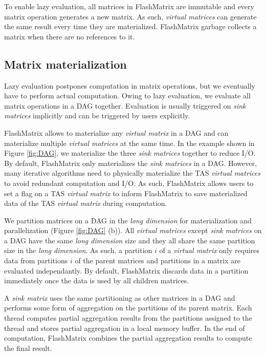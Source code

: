 To enable lazy evaluation, all matrices in FlashMatrix are immutable and every
matrix operation generates a new matrix. As such, \textit{virtual matrices}
can generate the same result every time they are materialized. FlashMatrix
garbage collects a matrix when there are no references to it.

\subsection{Matrix materialization} \label{sec:materialize}
Lazy evaluation postpones computation in matrix operations, but we eventually
have to perform actual computation. Owing to lazy evaluation,
we evaluate all matrix operations in a DAG together. Evaluation is
usually triggered on \textit{sink matrices} implicitly and can be triggered
by users explicitly.

FlashMatrix allows to materialize any \textit{virtual matrix} in a DAG and
can materialize multiple \textit{virtual matrices} at the same time.
In the example shown in Figure \ref{fig:DAG}, we materialize the three
\textit{sink matrices} together to reduce I/O.
By default, FlashMatrix only materializes the \textit{sink matrices} in a DAG.
However, many iterative algorithms need to physically materialize the TAS
\textit{virtual matrices} to avoid redundant computation and I/O. As such,
FlashMatrix allows users to set a flag on a TAS \textit{virtual matrix} to
inform FlashMatrix to save materialized data of the TAS \textit{virtual matrix}
during computation.

We partition matrices on a DAG in the \textit{long dimension} for materialization
and parallelization (Figure \ref{fig:DAG} (b)). All \textit{virtual matrices}
except \textit{sink matrices} on a DAG have the same \textit{long dimension}
size and they all share the same partition size in the \textit{long dimension}.
As such, a partition $i$ of a \textit{virtual matrix} only requires data from
partitions $i$ of the parent matrices and partitions in a matrix are
evaluated independantly. By default, FlashMatrix discards data in a partition
immediately once the data is used by all children matrices.

A \textit{sink matrix} uses the same partitioning as other matrices in a DAG
and performs some form of aggregation on the partitions
of its parent matrix. Each thread computes partial aggregation results from
the partitions assigned to the thread and stores partial
aggregation in a local memory buffer. In the end of computation, FlashMatrix
combines the partial aggregation results to compute the final result.

